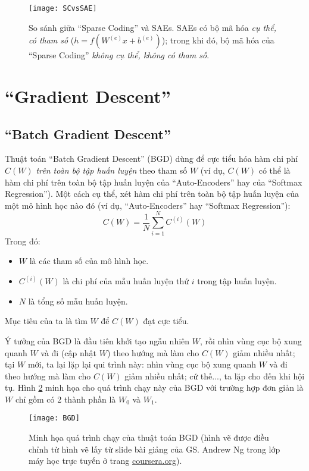 \begin{figure}
	\centering
	\texttt{[image: SCvsSAE]}
	\caption{So sánh giữa ``Sparse Coding'' và SAEs. SAEs có bộ mã hóa \emph{cụ thể, có tham số} ($h = f(W^{(e)}x + b^{(e)})$); trong khi đó, bộ mã hóa của ``Sparse Coding'' \emph{không cụ thể, không có tham số}.}
	\label{fig_SCvsSAE}
\end{figure}

\section{``Gradient Descent''}
\subsection{``Batch Gradient Descent''}
Thuật toán ``Batch Gradient Descent'' (BGD) dùng để cực tiểu hóa hàm chi phí $C(W)$ \emph{trên toàn bộ tập huấn luyện} theo tham số $W$ (ví dụ, $C(W)$ có thể là hàm chi phí trên toàn bộ tập huấn luyện của ``Auto-Encoders'' hay của ``Softmax Regression''). Một cách cụ thể, xét hàm chi phí trên toàn bộ tập huấn luyện của một mô hình học nào đó (ví dụ, ``Auto-Encoders'' hay ``Softmax Regression''):
\begin{equation}
	C(W) = \frac{1}{N} \sum_{i=1}^N C^{(i)}(W)
	\label{eq_CostFunct}
\end{equation}
Trong đó:
\begin{itemize}
	\item $W$ là các tham số của mô hình học.
	\item $C^{(i)}(W)$ là chi phí của mẫu huấn luyện thứ $i$ trong tập huấn luyện.
	\item $N$ là tổng số mẫu huấn luyện.
\end{itemize}
Mục tiêu của ta là tìm $W$ để $C(W)$ đạt cực tiểu.

Ý tưởng của BGD là đầu tiên khởi tạo ngẫu nhiên $W$, rồi nhìn vùng cục bộ xung quanh $W$ và đi (cập nhật $W$) theo hướng mà làm cho $C(W)$ giảm nhiều nhất; tại $W$ mới, ta lại lặp lại qui trình này: nhìn vùng cục bộ xung quanh $W$ và đi theo hướng mà làm cho $C(W)$ giảm nhiều nhất; cứ thế..., ta lặp cho đến khi hội tụ. Hình \ref{fig_BGD} minh họa cho quá trình chạy này của BGD với trường hợp đơn giản là $W$ chỉ gồm có 2 thành phần là $W_0$ và $W_1$.
\begin{figure}
	\centering
	\texttt{[image: BGD]}
	\caption{Minh họa quá trình chạy của thuật toán BGD (hình vẽ được điều chỉnh từ hình vẽ lấy từ slide bài giảng của GS. Andrew Ng trong lớp máy học trực tuyến ở trang \url{coursera.org}).}
	\label{fig_BGD}
\end{figure}

